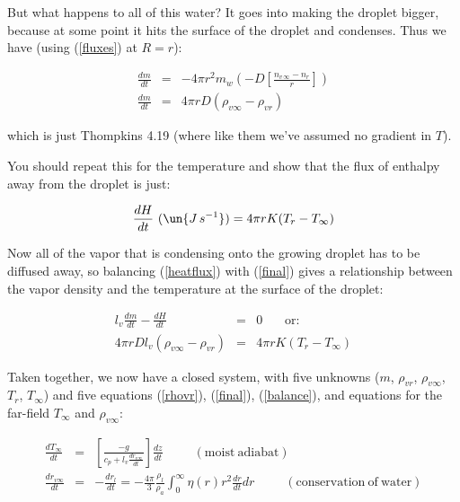 \documentclass[12pt]{article}
\begin{document}
But what happens to all of this water?  It goes into making the
droplet bigger, because at some point it hits the surface of the
droplet and condenses.  Thus we have (using (\ref{fluxes}) at $R=r$):

\begin{eqnarray}
  \label{final}
  \frac{dm}{dt}& =& -4 \pi r^2 m_w \left ( -D \left [ \frac{n_{v\,\infty} - n_r}{r} \right ] \right ) 
        \nonumber\\ 
  \frac{dm}{dt}& = &4 \pi r D (\rho_{v \infty} - \rho_{v r})
\end{eqnarray}

\noindent
which is just Thompkins 4.19 (where like them we've assumed no gradient
in $T$).

You should repeat this for the temperature and show that the flux of
enthalpy away from the droplet is just:


\begin{equation}
  \label{heatflux}
  \frac{dH}{dt}~(\un{J\,s^{-1}})= 4 \pi r K (T_r - T_\infty)
\end{equation}

Now all of the vapor that is condensing onto the growing droplet has
to be diffused away, so balancing (\ref{heatflux}) with (\ref{final})
gives a relationship between the vapor density and the temperature at
the surface of the droplet:

\begin{eqnarray}
  \label{balance}
  l_v \frac{dm}{dt} - \frac{dH}{dt} &=& 0 ~\mathrm{~~~~~~~or:} \nonumber\\
  4 \pi  r D l_v ( \rho_{v \infty} - \rho_{v r})&=&  4 \pi r K (T_r
  - T_\infty )
\end{eqnarray}


Taken together, we now have a closed system, with five unknowns
($m$, $\rho_{v r}$, $\rho_{v \infty}$, $T_r$, $T_\infty$) and five
equations (\ref{rhovr}), (\ref{final}), (\ref{balance}), and equations for
the far-field $T_\infty$ and $\rho_{v \infty}$: 

\begin{eqnarray}
  \label{moistad}
  \frac{dT_\infty}{dt}& =& \left [ \frac{ -g}{c_p + l_v \frac{d r_{v \infty}}{dt}}
     \right ] \frac{dz}{dt}~~~~~~~~~~~(\mathrm{moist~adiabat})\nonumber\\
  \frac{dr_{v \infty}}{dt}& =& -\frac{dr_{l}}{dt}= -\frac{4 \pi}{3}
   \frac{\rho_l}{\rho_a} \int_0^\infty \eta(r) r^2 \frac{dr}{dt} dr~~~~~~~~~~~(\mathrm{conservation~of~water})
\end{eqnarray}
\end{document}
